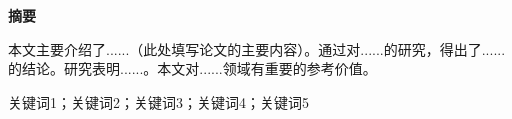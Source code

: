 \begin{center}
    {\songti\sanhao\bfseries 摘\quad 要}
  \end{center}
  
  \vspace{0.5em}
  
  \noindent\songti\xiaosi
  本文主要介绍了......（此处填写论文的主要内容）。通过对......的研究，得出了......的结论。研究表明......。本文对......领域有重要的参考价值。
  
  \vspace{1em}
  
  \quad 关键词1；关键词2；关键词3；关键词4；关键词5
  
  \vspace{1.5em}
  
  \newpage
  
  
  
  
  
  
